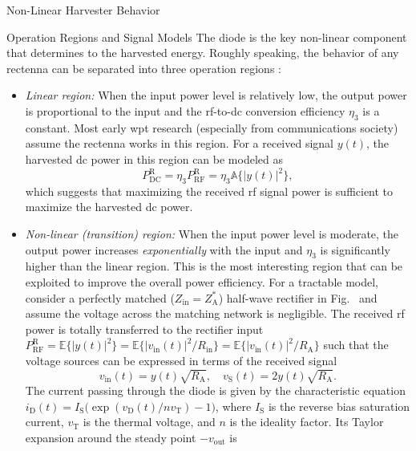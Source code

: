\begin{section}{}
\begin{subsection}{Non-Linear Harvester Behavior}
		\begin{subsubsection}{Operation Regions and Signal Models}\label{sc:operation_regions}
			The diode is the key non-linear component that determines to the harvested energy.
			Roughly speaking, the behavior of any rectenna can be separated into three operation regions \cite{Clerckx2016a}:
			\begin{itemize}
				\item \emph{Linear region:} When the input power level is relatively low, the output power is proportional to the input and the \gls{rf}-to-\gls{dc} conversion efficiency $\eta_3$ is a constant. Most early \gls{wpt} research (especially from communications society) assume the rectenna works in this region. For a received signal $y(t)$, the harvested \gls{dc} power in this region can be modeled as
				\begin{equation}
					P_\mathrm{DC}^\mathrm{R} = \eta_3 P_\mathrm{RF}^\mathrm{R} = \eta_3 \mathbb{A}\bigl\{ \lvert y(t) \rvert^2 \bigr\},
					\label{eq:dc_power_linear}
				\end{equation}
				which suggests that maximizing the received \gls{rf} signal power is sufficient to maximize the harvested \gls{dc} power.
				\item \emph{Non-linear (transition) region:} When the input power level is moderate, the output power increases \emph{exponentially} with the input and $\eta_3$ is significantly higher than the linear region. This is the most interesting region that can be exploited to improve the overall power efficiency.
				For a tractable model, consider a perfectly matched ($Z_\mathrm{in} = Z_\mathrm{A}^*$) half-wave rectifier in Fig.~ and assume the voltage across the matching network is negligible. The received \gls{rf} power is totally transferred to the rectifier input $P_\mathrm{RF}^\mathrm{R} = \mathbb{E}\bigl\{ \lvert y(t) \rvert^2 \bigr\} = \mathbb{E}\bigl\{ \lvert v_\mathrm{in}(t) \rvert^2 / R_\mathrm{in} \bigr\} = \mathbb{E}\bigl\{ \lvert v_\mathrm{in}(t) \rvert^2 / R_\mathrm{A} \bigr\}$ such that the voltage sources can be expressed in terms of the received signal \cite{Clerckx2016a}
				\begin{equation}
					v_\mathrm{in}(t) = y(t) \sqrt{R_\mathrm{A}}, \quad v_\mathrm{S}(t) = 2 y(t) \sqrt{R_\mathrm{A}}.
				\end{equation}
				The current passing through the diode is given by the characteristic equation $i_\mathrm{D}(t) = I_\mathrm{S} \bigl( \exp(v_\mathrm{D}(t) / n v_\mathrm{T}) - 1 \bigr)$, where $I_\mathrm{S}$ is the reverse bias saturation current, $v_\mathrm{T}$ is the thermal voltage, and $n$ is the ideality factor. Its Taylor expansion around the steady point $-v_\mathrm{out}$ is \cite{Clerckx2016a}

\end{itemize}
\end{subsubsection}
\end{subsection}
\end{section}
